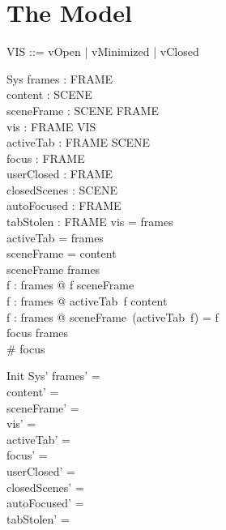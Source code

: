 \documentclass[a4paper,10pt,fleqn]{article}
\begin{document}
\section{The Model}

\begin{zed}
\end{zed}

\begin{zed}
  VIS ::= vOpen | vMinimized | vClosed
\end{zed}

\begin{schema}{Sys}
  frames : \power FRAME \\
  content : \power SCENE \\
  sceneFrame : SCENE \pfun FRAME \\
  vis : FRAME \pfun VIS \\
  activeTab : FRAME \pfun SCENE \\
  focus : \power FRAME \\
  userClosed : \power FRAME \\
  closedScenes : \power SCENE \\
  autoFocused : \power FRAME \\
  tabStolen : \power FRAME
\where
  \dom vis = frames \\
  \dom activeTab = frames \\
  \dom sceneFrame = content \\
  \ran sceneFrame \subseteq frames \\
  \forall f : frames @ f \in \ran sceneFrame \\
  \forall f : frames @ activeTab~f \in content \\
  \forall f : frames @ sceneFrame~(activeTab~f) = f \\
  focus \subseteq frames \\
  \# focus 
\end{schema}

\begin{schema}{Init}
  Sys'
\where
  frames' = \emptyset \\
  content' = \emptyset \\
  sceneFrame' = \emptyset \\
  vis' = \emptyset \\
  activeTab' = \emptyset \\
  focus' = \emptyset \\
  userClosed' = \emptyset \\
  closedScenes' = \emptyset \\
  autoFocused' = \emptyset \\
  tabStolen' = \emptyset
\end{schema}
\end{document}
